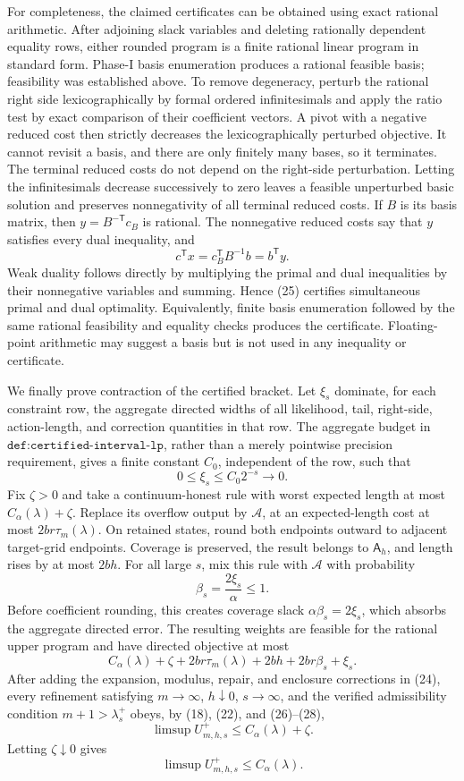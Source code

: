 For completeness, the claimed certificates can be obtained using exact
rational arithmetic.  After adjoining slack variables and deleting
rationally dependent equality rows, either rounded program is a finite
rational linear program in standard form.  Phase-I basis enumeration
produces a rational feasible basis; feasibility was established above.
To remove degeneracy, perturb the rational right side lexicographically by
formal ordered infinitesimals and apply the ratio test by exact comparison
of their coefficient vectors.  A pivot with a negative reduced cost then
strictly decreases the lexicographically perturbed objective.  It cannot
revisit a basis, and there are only finitely many bases, so it terminates.
The terminal reduced costs do not depend on the right-side perturbation.
Letting the infinitesimals decrease successively to zero leaves a feasible
unperturbed basic solution and preserves nonnegativity of all terminal
reduced costs.  If \(B\) is its basis matrix, then
\(y=B^{-\mathsf T}c_B\) is rational.  The nonnegative reduced costs say
that \(y\) satisfies every dual inequality, and
\[
 c^{\mathsf T}x=c_B^{\mathsf T}B^{-1}b=b^{\mathsf T}y.
 \tag{25}
\]
Weak duality follows directly by multiplying the primal and dual
inequalities by their nonnegative variables and summing.  Hence (25)
certifies simultaneous primal and dual optimality.  Equivalently, finite
basis enumeration followed by the same rational feasibility and equality
checks produces the certificate.  Floating-point arithmetic may suggest a
basis but is not used in any inequality or certificate.

We finally prove contraction of the certified bracket.  Let \(\xi_s\)
dominate, for each constraint row, the aggregate directed widths of all
likelihood, tail, right-side, action-length, and correction quantities in
that row.  The aggregate budget in
\(\texttt{def:certified-interval-lp}\), rather than a merely pointwise
precision requirement, gives a finite constant \(C_0\), independent of
the row, such that
\[
 0\leq\xi_s\leq C_0 2^{-s}\longrightarrow0.
 \tag{26}
\]
Fix \(\zeta>0\) and take a continuum-honest rule with worst expected
length at most \(C_\alpha(\lambda)+\zeta\).  Replace its overflow output
by \(\mathcal A\), at an expected-length cost at most
\(2br\tau_m(\lambda)\).  On retained states, round both endpoints outward
to adjacent target-grid endpoints.  Coverage is preserved, the result
belongs to \(\mathsf A_h\), and length rises by at most \(2bh\).  For all
large \(s\), mix this rule with \(\mathcal A\) with probability
\[
 \beta_s=\frac{2\xi_s}{\alpha}\leq1.
 \tag{27}
\]
Before coefficient rounding, this creates coverage slack
\(\alpha\beta_s=2\xi_s\), which absorbs the aggregate directed error.
The resulting weights are feasible for the rational upper program and
have directed objective at most
\[
 C_\alpha(\lambda)+\zeta+2br\tau_m(\lambda)+2bh
 +2br\beta_s+\xi_s.
 \tag{28}
\]
After adding the expansion, modulus, repair, and enclosure corrections in
(24), every refinement satisfying
\(m\to\infty\), \(h\downarrow0\), \(s\to\infty\), and the verified
admissibility condition \(m+1>\lambda_s^+\) obeys, by (18), (22), and
(26)--(28),
\[
 \limsup U_{m,h,s}^+\leq C_\alpha(\lambda)+\zeta.
\]
Letting \(\zeta\downarrow0\) gives
\[
 \limsup U_{m,h,s}^+\leq C_\alpha(\lambda).
 \tag{29}
\]

